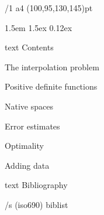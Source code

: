 \useOpTeX  %


\fnotelinks \Black \Black
\hyperlinks \Black \Black
{}


\enlang
\fontfam[garamondgeorgd]  %

\def\QED{\Umathchar"0"01"00203B}

\margins/1 a4 (100,95,130,145)pt

\typosize[12.21/14.5]
\parindent 1.5em
\parskip 1.5ex
 0.12ex

\bgroup
\let\_mtext\ignoreit
\nonum\notoc\chap Contents
\egroup
\tocpage


\sec The interpolation problem


\sec Positive definite functions


\sec Native spaces


\sec[errorsec] Error estimates


\sec Optimality


\sec[addingsec] Adding data







\bgroup
\let\_mtext\ignoreit
\nonum\chap Bibliography

\def\_opwarning#1{}
\usebib/s (iso690) biblist
\egroup

\bye
